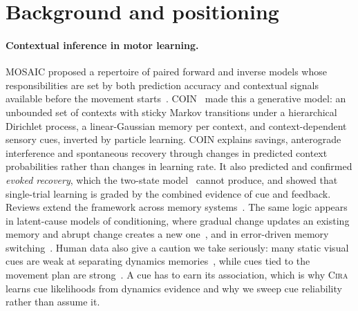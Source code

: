\documentclass[10pt]{article}
\newcommand{\method}{\textsc{Cira}}
\begin{document}
\section{Background and positioning}

\paragraph{Contextual inference in motor learning.}
MOSAIC proposed a repertoire of paired forward and inverse models whose responsibilities are set by
both prediction accuracy and contextual signals available before the movement
starts~\cite{wolpert1998multiple,haruno2001mosaic}. COIN~\cite{heald2021coin} made this a
generative model: an unbounded set of contexts with sticky Markov transitions under a hierarchical
Dirichlet process, a linear-Gaussian memory per context, and context-dependent sensory cues, inverted
by particle learning. COIN explains savings, anterograde interference and spontaneous recovery through
changes in predicted context probabilities rather than changes in learning rate. It also predicted and
confirmed \emph{evoked recovery}, which the two-state model~\cite{smith2006interacting} cannot
produce, and showed that single-trial learning is graded by the combined evidence of cue and feedback.
Reviews extend the framework across memory
systems~\cite{heald2023tics,heald2023annurev,shivkumar2025curriculum}. The same logic appears in
latent-cause models of conditioning, where gradual change updates an existing memory and abrupt change
creates a new one~\cite{gershman2010context,gershman2014statistical}, and in error-driven memory
switching~\cite{oh2019minimizing}. Human data also give a caution we take seriously: many static visual
cues are weak at separating dynamics memories~\cite{howard2013contextual}, while cues tied to the
movement plan are strong~\cite{sheahan2016planning}. A cue has to earn its association, which is why
\method{} learns cue likelihoods from dynamics evidence and why we sweep cue reliability rather than
assume it.
\end{document}

